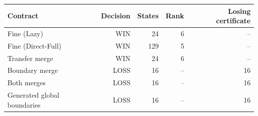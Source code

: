\begin{tabular}{lrrrr}
\toprule
Contract & Decision & States & Rank & Losing certificate \\
\midrule
Fine (Lazy) & WIN & 24 & 6 & -- \\
Fine (Direct-Full) & WIN & 129 & 5 & -- \\
Transfer merge & WIN & 24 & 6 & -- \\
Boundary merge & LOSS & 16 & -- & 16 \\
Both merges & LOSS & 16 & -- & 16 \\
Generated global boundaries & LOSS & 16 & -- & 16 \\
\bottomrule
\end{tabular}
